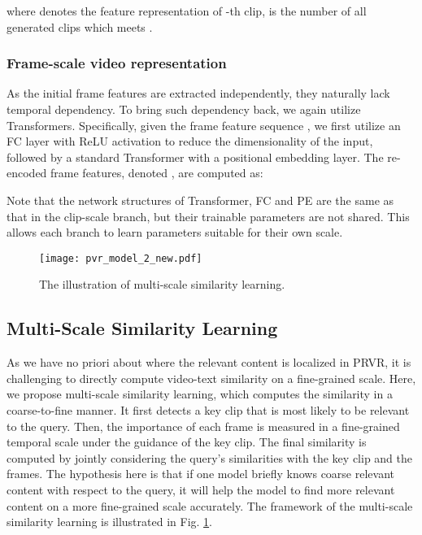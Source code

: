\documentclass[sigconf]{acmart}
\begin{document}
where  denotes the feature representation of -th clip,  is the number of all generated clips which meets .




\subsubsection{Frame-scale video representation}
As the initial frame features are extracted independently, they naturally lack temporal dependency. To bring such dependency back,  we again utilize Transformers. 
Specifically, given the frame feature sequence , we first utilize an FC layer with ReLU activation to reduce the dimensionality of the input, followed by a standard Transformer with a positional embedding layer. The re-encoded frame features, denoted , are computed as:  

Note that the network structures of Transformer, FC and PE are the same as that in the clip-scale branch, but their trainable parameters are not shared. This allows each branch to learn parameters suitable for their own scale.



\begin{figure}[tb!]
\centering\texttt{[image: pvr\_model\_2\_new.pdf]}
\vspace{-8mm}
\caption{The illustration of multi-scale similarity learning. }\label{fig:ms-sl}
\end{figure}



\subsection{Multi-Scale Similarity Learning}\label{ssec:mssl}
As we have no priori about where the relevant content is localized in PRVR, it is challenging to directly compute video-text similarity on a fine-grained scale.
Here, we propose multi-scale similarity learning, which computes the similarity in a coarse-to-fine manner.
It first detects a key clip that is most likely to be relevant to the query. 
Then, the importance of each frame is measured in a fine-grained temporal scale under the guidance of the key clip.
The final similarity is computed by jointly considering the query's similarities with the key clip and the frames.
The hypothesis here is that if one model briefly knows coarse relevant content with respect to the query, it will help the model to find more relevant content on a more fine-grained scale accurately.
The framework of the multi-scale similarity learning is illustrated in Fig. \ref{fig:ms-sl}.
\end{document}
